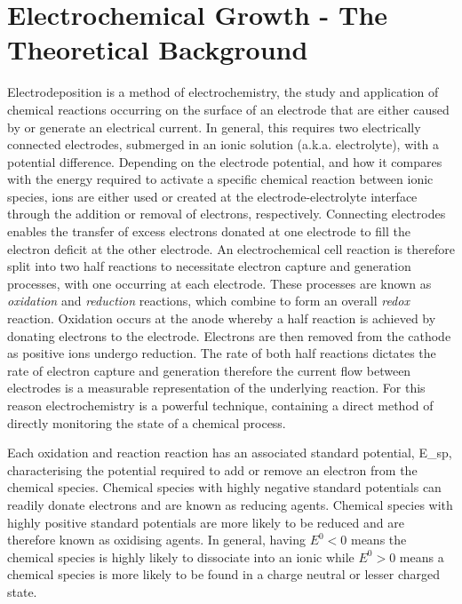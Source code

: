 \documentclass{article}
\begin{document}
\section{Electrochemical Growth - The Theoretical Background}

Electrodeposition is a method of electrochemistry, the study and application of chemical reactions occurring on the surface of an electrode that are either caused by or generate an electrical current. In general, this requires two electrically connected electrodes, submerged in an ionic solution (a.k.a. electrolyte), with a potential difference. Depending on the electrode potential, and how it compares with the energy required to activate a specific chemical reaction between ionic species, ions are either used or created at the electrode-electrolyte interface through the addition or removal of electrons, respectively. Connecting electrodes enables the transfer of excess electrons donated at one electrode to fill the electron deficit at the other electrode. An electrochemical cell reaction is therefore split into two half reactions to necessitate electron capture and generation processes, with one occurring at each electrode. These processes are known as \textit{oxidation} and \textit{reduction} reactions, which combine to form an overall \textit{redox} reaction. Oxidation occurs at the anode whereby a half reaction is achieved by donating electrons to the electrode. Electrons are then removed from the cathode as positive ions undergo reduction. The rate of both half reactions dictates the rate of electron capture and generation therefore the current flow between electrodes is a measurable representation of the underlying reaction. For this reason electrochemistry is a powerful technique, containing a direct method of directly monitoring the state of a chemical process.

Each oxidation and reaction reaction has an associated standard potential, \gls{E_sp}, characterising the  potential required to add or remove an electron from the chemical species. Chemical species with highly negative standard potentials can readily donate electrons and are known as reducing agents. Chemical species with highly positive standard potentials are more likely to be reduced and are therefore known as oxidising agents. In general, having $E^0<0$ means the chemical species is highly likely to dissociate into an ionic  while $E^0>0$ means a chemical species is more likely to be found in a charge neutral or lesser charged state.
\end{document}
